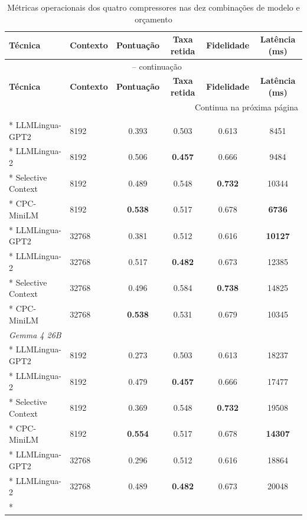{
\footnotesize
\setlength{\tabcolsep}{4pt}
\begin{longtable}{llcccc}
\caption{Métricas operacionais dos quatro compressores nas dez combinações de modelo e orçamento}
\label{tab:triagem-compressores-operacional} \\
\toprule
\textbf{Técnica} & \textbf{Contexto} & \textbf{Pontuação} & \textbf{Taxa retida} & \textbf{Fidelidade} & \textbf{Latência (ms)} \\
\midrule
\endfirsthead
\multicolumn{6}{c}{\tablename\ \thetable{} -- continuação} \\
\toprule
\textbf{Técnica} & \textbf{Contexto} & \textbf{Pontuação} & \textbf{Taxa retida} & \textbf{Fidelidade} & \textbf{Latência (ms)} \\
\midrule
\endhead
\midrule
\multicolumn{6}{r}{Continua na próxima página} \\
\endfoot
\bottomrule
\endlastfoot
\multicolumn{6}{l}{\textit{Llama 3.1 8B}} \\*
LLMLingua-GPT2    & 8192  & 0.393 & 0.503 & 0.613 & 8451 \\*
LLMLingua-2       & 8192  & 0.506 & \textbf{0.457} & 0.666 & 9484 \\*
Selective Context & 8192  & 0.489 & 0.548 & \textbf{0.732} & 10344 \\*
CPC-MiniLM        & 8192  & \textbf{0.538} & 0.517 & 0.678 & \textbf{6736} \\*
LLMLingua-GPT2    & 32768 & 0.381 & 0.512 & 0.616 & \textbf{10127} \\*
LLMLingua-2       & 32768 & 0.517 & \textbf{0.482} & 0.673 & 12385 \\*
Selective Context & 32768 & 0.496 & 0.584 & \textbf{0.738} & 14825 \\*
CPC-MiniLM        & 32768 & \textbf{0.538} & 0.531 & 0.679 & 10345 \\
\midrule
\multicolumn{6}{l}{\textit{Gemma 4 26B}} \\*
LLMLingua-GPT2    & 8192  & 0.273 & 0.503 & 0.613 & 18237 \\*
LLMLingua-2       & 8192  & 0.479 & \textbf{0.457} & 0.666 & 17477 \\*
Selective Context & 8192  & 0.369 & 0.548 & \textbf{0.732} & 19508 \\*
CPC-MiniLM        & 8192  & \textbf{0.554} & 0.517 & 0.678 & \textbf{14307} \\*
LLMLingua-GPT2    & 32768 & 0.296 & 0.512 & 0.616 & 18864 \\*
LLMLingua-2       & 32768 & 0.489 & \textbf{0.482} & 0.673 & 20048 \\*

\end{longtable}}
